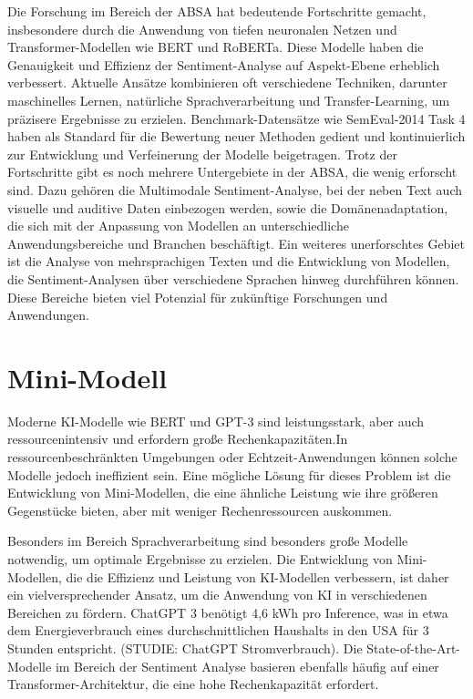 \documentclass[12pt]{article}
\begin{document}
Die Forschung im Bereich der ABSA hat bedeutende Fortschritte gemacht, insbesondere durch die Anwendung von tiefen neuronalen Netzen und 
Transformer-Modellen wie BERT und RoBERTa. Diese Modelle haben die Genauigkeit und Effizienz der Sentiment-Analyse auf Aspekt-Ebene erheblich 
verbessert. Aktuelle Ansätze kombinieren oft verschiedene Techniken, darunter maschinelles Lernen, natürliche Sprachverarbeitung und Transfer-Learning, 
um präzisere Ergebnisse zu erzielen. Benchmark-Datensätze wie SemEval-2014 Task 4 haben als Standard für die Bewertung neuer Methoden gedient und 
kontinuierlich zur Entwicklung und Verfeinerung der Modelle beigetragen.
\newline
\newline
Trotz der Fortschritte gibt es noch mehrere Untergebiete in der ABSA, die wenig erforscht sind. Dazu gehören die Multimodale Sentiment-Analyse, bei der 
neben Text auch visuelle und auditive Daten einbezogen werden, sowie die Domänenadaptation, die sich mit der Anpassung von Modellen an unterschiedliche 
Anwendungsbereiche und Branchen beschäftigt. Ein weiteres unerforschtes Gebiet ist die Analyse von mehrsprachigen Texten und die Entwicklung von 
Modellen, die Sentiment-Analysen über verschiedene Sprachen hinweg durchführen können. Diese Bereiche bieten viel Potenzial für zukünftige Forschungen 
und Anwendungen.

\section{Mini-Modell}

Moderne KI-Modelle wie BERT und GPT-3 sind leistungsstark, aber auch ressourcenintensiv und erfordern große Rechenkapazitäten.\newline In ressourcenbeschränkten 
Umgebungen oder Echtzeit-Anwendungen können solche Modelle jedoch ineffizient sein. Eine mögliche Lösung für dieses Problem ist die Entwicklung von 
Mini-Modellen, die eine ähnliche Leistung wie ihre größeren Gegenstücke bieten, aber mit weniger Rechenressourcen auskommen.

Besonders im Bereich Sprachverarbeitung sind besonders große Modelle notwendig, um optimale Ergebnisse zu erzielen. Die Entwicklung von Mini-Modellen, 
die die Effizienz und Leistung von KI-Modellen verbessern, ist daher ein vielversprechender Ansatz, um die Anwendung von KI in verschiedenen Bereichen 
zu fördern. 
\newline
\newline
ChatGPT 3 benötigt 4,6 kWh pro Inference, was in etwa dem Energieverbrauch eines durchschnittlichen Haushalts in den USA für 3 Stunden entspricht. 
(STUDIE: ChatGPT Stromverbrauch). Die State-of-the-Art-Modelle im Bereich der Sentiment Analyse basieren ebenfalls häufig auf einer Transformer-Architektur, 
die eine hohe Rechenkapazität erfordert.
\end{document}
